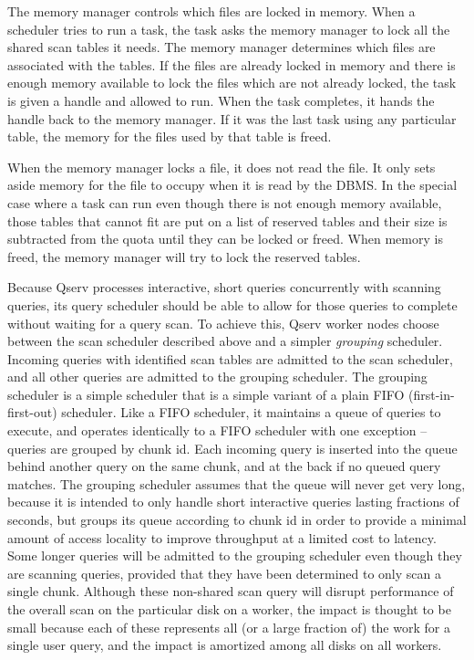 \documentclass[DM,toc]{lsstdoc}
\begin{document}
The memory manager controls which files are locked in memory. When a
scheduler tries to run a task, the task asks the memory manager to lock
all the shared scan tables it needs. The memory manager determines which
files are associated with the tables. If the files are already locked in
memory and there is enough memory available to lock the files which are
not already locked, the task is given a handle and allowed to run. When
the task completes, it hands the handle back to the memory manager. If
it was the last task using any particular table, the memory for the
files used by that table is freed.

When the memory manager locks a file, it does not read the file. It only
sets aside memory for the file to occupy when it is read by the DBMS. In
the special case where a task can run even though there is not enough
memory available, those tables that cannot fit are put on a list of
reserved tables and their size is subtracted from the quota until they
can be locked or freed. When memory is freed, the memory manager will
try to lock the reserved tables.

Because Qserv processes interactive, short queries concurrently with
scanning queries, its query scheduler should be able to allow for those
queries to complete without waiting for a query scan. To achieve this,
Qserv worker nodes choose between the scan scheduler described above and
a simpler \emph{grouping} scheduler. Incoming queries with identified
scan tables are admitted to the scan scheduler, and all other queries
are admitted to the grouping scheduler. The grouping scheduler is a
simple scheduler that is a simple variant of a plain FIFO
(first-in-first-out) scheduler. Like a FIFO scheduler, it maintains a
queue of queries to execute, and operates identically to a FIFO
scheduler with one exception -- queries are grouped by chunk id. Each
incoming query is inserted into the queue behind another query on the
same chunk, and at the back if no queued query matches. The grouping
scheduler assumes that the queue will never get very long, because it is
intended to only handle short interactive queries lasting fractions of
seconds, but groups its queue according to chunk id in order to provide
a minimal amount of access locality to improve throughput at a limited
cost to latency. Some longer queries will be admitted to the grouping
scheduler even though they are scanning queries, provided that they have
been determined to only scan a single chunk. Although these non-shared
scan query will disrupt performance of the overall scan on the
particular disk on a worker, the impact is thought to be small because
each of these represents all (or a large fraction of) the work for a
single user query, and the impact is amortized among all disks on all
workers.
\end{document}
